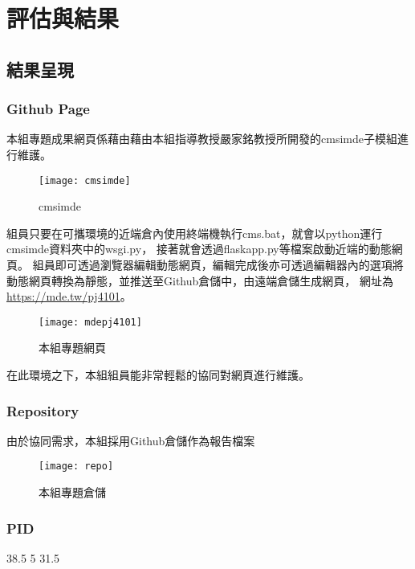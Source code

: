 \chapter{評估與結果}

\section{結果呈現}
\subsection{Github Page}
本組專題成果網頁係藉由藉由本組指導教授嚴家銘教授所開發的cmsimde子模組進行維護。\\

\begin{figure}[h]
    \centering
    \texttt{[image: cmsimde]}
    \caption{cmsimde}
\end{figure}

組員只要在可攜環境的近端倉內使用終端機執行cms.bat，就會以python運行cmsimde資料夾中的wsgi.py，
接著就會透過flaskapp.py等檔案啟動近端的動態網頁。
組員即可透過瀏覽器編輯動態網頁，編輯完成後亦可透過編輯器內的選項將動態網頁轉換為靜態，並推送至Github倉儲中，由遠端倉儲生成網頁，
網址為\url{https://mde.tw/pj4101}。\\

\begin{figure}[h]
    \centering
    \texttt{[image: mdepj4101]}
    \caption{本組專題網頁}
\end{figure}

在此環境之下，本組組員能非常輕鬆的協同對網頁進行維護。\\

\subsection{Repository}
由於協同需求，本組採用Github倉儲作為報告檔案
\begin{figure}[h]
    \centering
    \texttt{[image: repo]}
    \caption{本組專題倉儲}
\end{figure}

\subsection{PID}
38.5
5
31.5

\subsection{}

